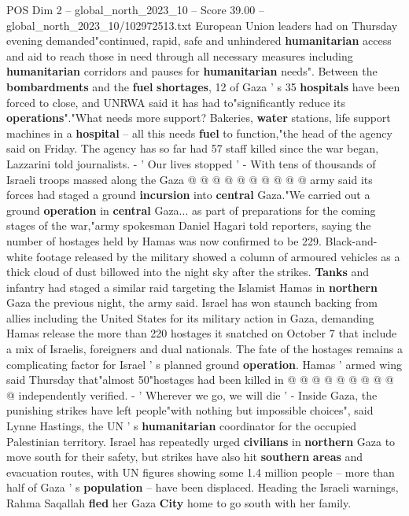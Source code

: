 \begin{textsample}{POS Dim 2 – global\_north\_2023\_10 – Score 39.00 – global\_north\_2023\_10/102972513.txt}
European Union leaders had on Thursday evening demanded"continued, rapid, safe and unhindered \textbf{humanitarian} access and aid to reach those in need through all necessary measures including \textbf{humanitarian} corridors and pauses for \textbf{humanitarian} needs".
Between the \textbf{bombardments} and the \textbf{fuel} \textbf{shortages}, 12 of Gaza ' s 35 \textbf{hospitals} have been forced to close, and UNRWA said it has had to"significantly reduce its \textbf{operations}"."What needs more support?
Bakeries, \textbf{water} stations, life support machines in a \textbf{hospital} -- all this needs \textbf{fuel} to function,"the head of the agency said on Friday.
The agency has so far had 57 staff killed since the war began, Lazzarini told journalists. - ' Our lives stopped ' - With tens of thousands of Israeli troops massed along the Gaza @ @ @ @ @ @ @ @ @ @ army said its forces had staged a ground \textbf{incursion} into \textbf{central} Gaza."We carried out a ground \textbf{operation} in \textbf{central} Gaza... as part of preparations for the coming stages of the war,"army spokesman Daniel Hagari told reporters, saying the number of hostages held by Hamas was now confirmed to be 229.
Black-and-white footage released by the military showed a column of armoured vehicles as a thick cloud of dust billowed into the night sky after the strikes. \textbf{Tanks} and infantry had staged a similar raid targeting the Islamist Hamas in \textbf{northern} Gaza the previous night, the army said.
Israel has won staunch backing from allies including the United States for its military action in Gaza, demanding Hamas release the more than 220 hostages it snatched on October 7 that include a mix of Israelis, foreigners and dual nationals.
The fate of the hostages remains a complicating factor for Israel ' s planned ground \textbf{operation}.
Hamas ' armed wing said Thursday that"almost 50"hostages had been killed in @ @ @ @ @ @ @ @ @ @ independently verified. - ' Wherever we go, we will die ' - Inside Gaza, the punishing strikes have left people"with nothing but impossible choices", said Lynne Hastings, the UN ' s \textbf{humanitarian} coordinator for the occupied Palestinian territory.
Israel has repeatedly urged \textbf{civilians} in \textbf{northern} Gaza to move south for their safety, but strikes have also hit \textbf{southern} \textbf{areas} and evacuation routes, with UN figures showing some 1.4 million people -- more than half of Gaza ' s \textbf{population} -- have been displaced.
Heading the Israeli warnings, Rahma Saqallah \textbf{fled} her Gaza \textbf{City} home to go south with her family.

\end{textsample}
